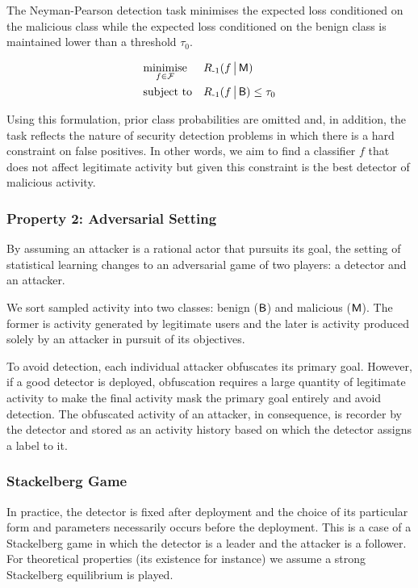 \begin{definition}\label{def:np_task}
    The Neyman-Pearson detection task minimises the expected loss conditioned on the malicious class while the expected loss conditioned on the benign class is maintained lower than a threshold $\tau_0$.

    \begin{equation*}
        \begin{aligned}
        & \underset{f \in \mathcal{F}} {\text{minimise}}
        & & R_{{\text{-}1}}(f \,\big|\, \mathsf{M}) \\
        & \text{subject to}
        & & R_{{\text{-}1}}(f \,\big|\, \mathsf{B}) \leq \tau_0 \\
        \end{aligned}
    \end{equation*}
\end{definition}

Using this formulation, prior class probabilities are omitted and, in addition, the task reflects the nature of security detection problems in which there is a hard constraint on false positives. In other words, we aim to find a classifier $f$ that does not affect legitimate activity but given this constraint is the best detector of malicious activity.

\subsubsection{Property 2: Adversarial Setting}
By assuming an attacker is a rational actor that pursuits its goal, the setting of statistical learning changes to an adversarial game of two players: a detector and an attacker.

We sort sampled activity into two classes: benign ($\mathsf{B}$) and malicious ($\mathsf{M}$). The former is activity generated by legitimate users and the later is activity produced solely by an attacker in pursuit of its objectives.

To avoid detection, each individual attacker obfuscates its primary goal. However, if a good detector is deployed, obfuscation requires a large quantity of legitimate activity to make the final activity mask the primary goal entirely and avoid detection. The obfuscated activity of an attacker, in consequence, is recorder by the detector and stored as an activity history based on which the detector assigns a label to it.

\subsubsection{Stackelberg Game}\label{sec:stackelberg_game}
In practice, the detector is fixed after deployment and the choice of its particular form and parameters necessarily occurs before the deployment. This is a case of a Stackelberg game \cite{stackelberg_games} in which the detector is a leader and the attacker is a follower. For theoretical properties (its existence for instance) we assume a strong Stackelberg equilibrium is played.

